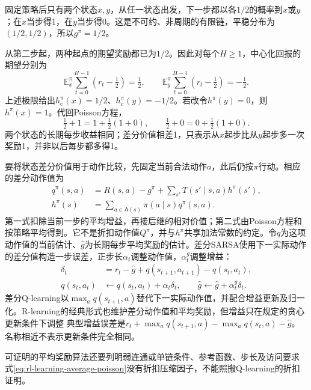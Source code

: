 \begin{example}
  \label{ex:rl-learning-differential-value}
  固定策略后只有两个状态$x,y$，从任一状态出发，下一步都以各$1/2$的概率到$x$或$y$；在$x$当步得1，在$y$当步得0。这是不可约、非周期的有限链，平稳分布为$(1/2,1/2)$，所以$g^\pi=1/2$。

  从第二步起，两种起点的期望奖励都已为$1/2$。因此对每个$H\geq1$，中心化回报的期望分别为
  \[
    \mathbb E_x^\pi\sum_{t=0}^{H-1}(r_t-\tfrac12)
      =\tfrac12,\qquad
    \mathbb E_y^\pi\sum_{t=0}^{H-1}(r_t-\tfrac12)
      =-\tfrac12.
  \]
  上述极限给出$h_{\mathrm c}^\pi(x)=1/2$、$h_{\mathrm c}^\pi(y)=-1/2$。若改令$h^\pi(y)=0$，则$h^\pi(x)=1$。代回Poisson方程，
  \[
    \tfrac12+1=1+\tfrac12(1+0),\qquad
    \tfrac12+0=0+\tfrac12(1+0).
  \]
  两个状态的长期每步收益相同；差分价值相差1，只表示从$x$起步比从$y$起步多一次奖励1，并非以后每步都多得1。
\end{example}

要将状态差分价值用于动作比较，先固定当前合法动作$a$，此后仍按$\pi$行动。相应的差分动作值为
\[
  \begin{aligned}
    q^\pi(s,a)
      &=R(s,a)-g^\pi
        +\sum_{s'}T(s'\mid s,a)h^\pi(s'),\\
    h^\pi(s)
      &=\sum_{a\in\mathsf A(s)}\pi(a\mid s)q^\pi(s,a).
  \end{aligned}
\]
第一式扣除当前一步的平均增益，再接后继的相对价值；第二式由Poisson方程和按策略平均得到。它不是折扣动作值$Q^\pi$，并与$h^\pi$共享加法常数的约定。令$q$为这项动作值的当前估计、$\widehat g$为长期每步平均奖励的估计。差分SARSA使用下一实际动作的差分值构造一步误差，正步长$\alpha_t$调整动作值，$\alpha_t^g$调整增益：
\[
  \begin{aligned}
    \delta_t&=r_t-\widehat g+q(s_{t+1},a_{t+1})-q(s_t,a_t),\\
    q(s_t,a_t)&\leftarrow q(s_t,a_t)+\alpha_t\delta_t,\qquad
    \widehat g\leftarrow\widehat g+\alpha_t^g\delta_t .
  \end{aligned}
\]
差分Q-learning以$\max_a q(s_{t+1},a)$替代下一实际动作值，并配合增益更新及归一化。R-learning的经典形式也维护差分动作值和平均奖励，但增益只在规定的贪心更新条件下调整
典型增益误差是$r_t+\max_aq(s_{t+1},a)-\max_aq(s_t,a)-\widehat g$。名称相近不表示更新条件完全相同。

可证明的平均奖励算法还要列明弱连通或单链条件、参考函数、步长及访问要求
式\eqref{eq:rl-learning-average-poisson}没有折扣压缩因子，不能照搬Q-learning的折扣证明。

